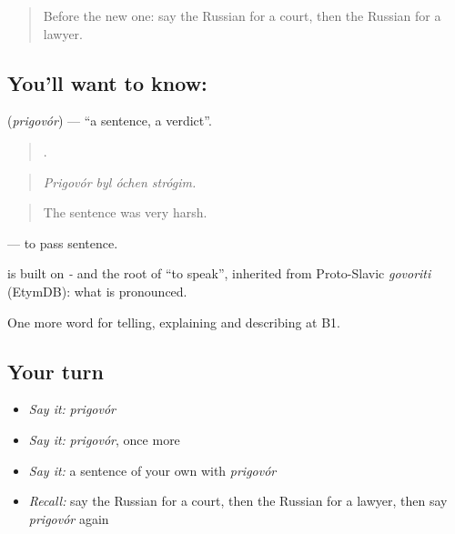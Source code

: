 \label{lesson:RU-C293-prigovor}



\begin{quote}
Before the new one: say the Russian for a court, then the Russian for a lawyer.
\end{quote}

\subsection*{You'll want to know: }
\textbf{} (\emph{prigovór}) — \textquotedblleft{}a sentence, a verdict\textquotedblright{}.

\begin{quote}
   .
\end{quote}

\begin{quote}
\emph{Prigovór byl óchen strógim.}
\end{quote}

\begin{quote}
The sentence was very harsh.
\end{quote}

\emph{ } — to pass sentence.

\begin{cousinweb}
\emph{} is built on \emph{-} and the root of \emph{} \textquotedblleft{}to speak\textquotedblright{}, inherited from Proto-Slavic \emph{govoriti} (EtymDB): what is pronounced.
\end{cousinweb}

\begin{grammarlens}[title={What you've built}]
One more word for telling, explaining and describing at B1.
\end{grammarlens}

\subsection*{Your turn}
\begin{itemize}
\raggedright
  \item \emph{Say it:} \emph{prigovór}
  \item \emph{Say it:} \emph{prigovór}, once more
  \item \emph{Say it:} a sentence of your own with \emph{prigovór}
  \item \emph{Recall:} say the Russian for a court, then the Russian for a lawyer, then say \emph{prigovór} again
\end{itemize}

